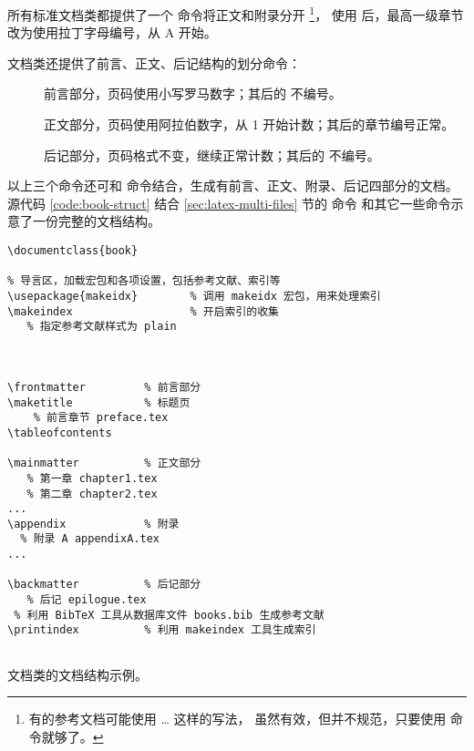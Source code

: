 所有标准文档类都提供了一个  命令将正文和附录分开%
\footnote{有的参考文档可能使用  \ldots{}  这样的写法，
虽然有效，但并不规范，只要使用  命令就够了。}，
使用  后，最高一级章节改为使用拉丁字母编号，从 A 开始。

 文档类还提供了前言、正文、后记结构的划分命令：
\begin{description}
  \item[] 前言部分，页码使用小写罗马数字；其后的  不编号。
  \item[] 正文部分，页码使用阿拉伯数字，从 1 开始计数；其后的章节编号正常。
  \item[] 后记部分，页码格式不变，继续正常计数；其后的  不编号。
\end{description}

以上三个命令还可和  命令结合，生成有前言、正文、附录、后记四部分的文档。
源代码 \ref{code:book-struct} 结合 \ref{sec:latex-multi-files} 节的  命令
和其它一些命令示意了一份完整的文档结构。

\begin{sourcecode}[htp]
\begin{Verbatim}
\documentclass{book}

% 导言区，加载宏包和各项设置，包括参考文献、索引等
\usepackage{makeidx}        % 调用 makeidx 宏包，用来处理索引
\makeindex                  % 开启索引的收集
   % 指定参考文献样式为 plain



\frontmatter         % 前言部分
\maketitle           % 标题页
    % 前言章节 preface.tex
\tableofcontents

\mainmatter          % 正文部分
   % 第一章 chapter1.tex
   % 第二章 chapter2.tex
...
\appendix            % 附录
  % 附录 A appendixA.tex
...

\backmatter          % 后记部分
   % 后记 epilogue.tex
 % 利用 BibTeX 工具从数据库文件 books.bib 生成参考文献
\printindex          % 利用 makeindex 工具生成索引


\end{Verbatim}
\caption{ 文档类的文档结构示例。}\label{code:book-struct}
\end{sourcecode}

